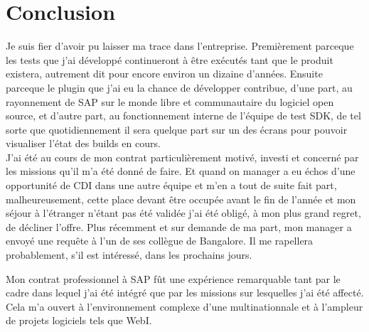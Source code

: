 \chapter*{Conclusion}



Je suis fier d'avoir pu laisser ma trace dans l'entreprise. Premièrement parceque les tests que j'ai développé continueront à être exécutés tant que le produit existera, autrement dit pour encore environ un dizaine d'années. Ensuite parceque le plugin que j'ai eu la chance de développer contribue, d'une part, au rayonnement de SAP sur le monde libre et communautaire du logiciel open source, et d'autre part, au fonctionnement interne de l'équipe de test SDK, de tel sorte que quotidiennement il sera quelque part sur un des écrans pour pouvoir visualiser l'état des builds en cours.\\

J'ai \'{e}t\'{e} au cours de mon contrat particulièrement motiv\'{e}, investi et concern\'{e} par les missions qu'il m'a été donné de faire. Et quand on manager a eu échos d'une opportunité de CDI dans une autre équipe et m'en a tout de suite fait part, malheureusement, cette place devant être occupée avant le fin de l'année et mon séjour à l'étranger n'étant pas été validée j'ai été obligé, à mon plus grand regret, de décliner l'offre. Plus récemment et sur demande de ma part, mon manager a envoyé une requête à l'un de ses collègue de Bangalore. Il me rapellera probablement, s'il est intéressé, dans les prochains jours.


Mon contrat professionnel à SAP fût une expérience remarquable tant par le cadre dans lequel j'ai été intégré que par les missions sur lesquelles j'ai été affecté. Cela m'a ouvert à l'environnement complexe d'une multinationnale et à l'ampleur de projets logiciels tels que WebI.